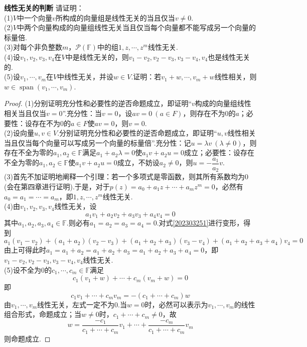 \documentclass[lang=cn, zihao=5]{elegantbook}
\newcommand{\F}{\mathbb{F}}
\DeclareMathOperator{\spn}{span}
\newcommand{\examplefont}[1]{\color{mgreen} \textbf{#1}}
\begin{document}
\begin{example}{\examplefont{线性无关的判断}}
	请证明： \\
	(1)$V$中一个向量$v$所构成的向量组是线性无关的当且仅当$v \neq 0$. \\
	(2)$V$中两个向量构成的向量组线性无关当且仅当每个向量都不能写成另一个向量的标量倍. \\
	(3)对每个非负整数$m$，$\mathcal{P} (\F)$中的组$1,z, \cdots ,z^m$线性无关. \\
	(4)设$v_1,v_2,v_3,v_4$在$V$中是线性无关的，则$v_1-v_2,v_2-v_3,v_3-v_4,v_4$也是线性无关的. \\
	(5)设$v_1, \cdots ,v_m$在$V$中线性无关，并设$w \in V$.证明：若$v_1+w , \cdots ,v_m+w$线性相关，则$w \in \spn (v_1 , \cdots ,v_m)$.
\end{example}
\begin{proof}
	(1)分别证明充分性和必要性的逆否命题成立，即证明“$v$构成的向量组线性相关当且仅当$v=0$”.充分性：当$v=0$，设$av=0~(a\in F )$，则存在不为$0$的$a$；必要性：设存在不为$0$的$a\in F$使$av=0$，则$v=0$. \\
	(2)设向量$u,v \in V$.分别证明充分性和必要性的逆否命题成立，即证明“$u,v$线性相关当且仅当每个向量可以写成另一个向量的标量倍”.充分性：记$u=\lambda v~(\lambda \neq 0)$，则存在不全为零的$a_1,a_2 \in \F $满足$a_1+a_2 \lambda =0$使$a_1v+a_2 u =0$成立；必要性：设存在不全为零的$a_1,a_2 \in \F $使$a_1 v + a_2 u=0$成立，不妨设$a_2 \neq 0$，则$u=-\dfrac{a_1}{a_2}v$. \\
	(3)首先不加证明地阐释一个引理：若一个多项式是零函数，则其所有系数均为$0$(会在第四章进行证明).于是，对于$p(z)=a_0+a_1z+ \cdots +a_mz^m=0$，必然有$a_0=a_1= \cdots =a_m$，即$1,z,\cdots ,z^m$线性无关. \\
	(4)由$v_1,v_2,v_3,v_4$线性无关，设\begin{equation}
		a_1v_1+a_2v_2+a_3v_3+a_4v_4=0 \label{202303251}
	\end{equation}
	其中$a_1,a_2,a_3,a_4 \in \F $.则必有$a_1=a_2=a_3=a_4=0$.对式\ref{202303251}进行变形，得到$$a_1(v_1-v_2)+(a_1+a_2)(v_2-v_3)+(a_1+a_2+a_3)(v_3-v_4)+(a_1+a_2+a_3+a_4)v_4=0$$
	由上可得此时$a_1=a_1+a_2=a_1+a_2+a_3=a_1+a_2+a_3+a_4=0$，即$v_1-v_2,v_2-v_3,v_3-v_4,v_4$线性无关. \\
	(5)设不全为$0$的$c_1,\cdots ,c_m \in \F $满足$$c_1(v_1+w)+ \cdots + c_m(v_m+w)=0$$
	即$$c_1v_1+ \cdots + c_mv_m = -(c_1+ \cdots + c_m)w$$
	由$v_1,\cdots ,v_m$线性无关，左式一定不为$0$.当$w=0$时，必然可以表示为$v_1,\cdots ,v_m$的线性组合形式，命题成立；当$w \neq 0$时，$c_1+ \cdots + c_m \neq 0$，故$$w=\frac{-c_1}{c_1+ \cdots + c_m}v_1 + \cdots + \frac{-c_m}{c_1+ \cdots + c_m}v_m$$
	则命题成立.
\end{proof}
\end{document}
